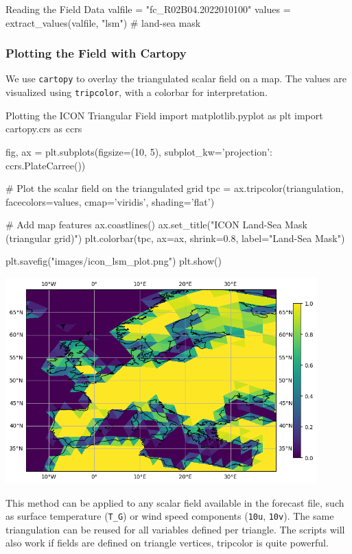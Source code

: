 \begin{codeonly}{Reading the Field Data}
valfile = "fc_R02B04.2022010100"
values = extract_values(valfile, "lsm")  # land-sea mask
\end{codeonly}

\subsubsection*{Plotting the Field with Cartopy}

We use \texttt{cartopy} to overlay the triangulated scalar field on a map. The values are visualized using \texttt{tripcolor}, with a colorbar for interpretation.

\begin{codeonly}{Plotting the ICON Triangular Field}
import matplotlib.pyplot as plt
import cartopy.crs as ccrs

fig, ax = plt.subplots(figsize=(10, 5), subplot_kw={'projection': ccrs.PlateCarree()})

# Plot the scalar field on the triangulated grid
tpc = ax.tripcolor(triangulation, facecolors=values, cmap='viridis', shading='flat')

# Add map features
ax.coastlines()
ax.set_title("ICON Land-Sea Mask (triangular grid)")
plt.colorbar(tpc, ax=ax, shrink=0.8, label="Land-Sea Mask")

plt.savefig("images/icon_lsm_plot.png")
plt.show()
\end{codeonly}

\begin{center}
\includegraphics[width=0.9\textwidth]{images/icon_lsm_plot.png}
\end{center}

This method can be applied to any scalar field available in the forecast file, such as surface temperature (\texttt{T\_G}) or wind speed components (\texttt{10u}, \texttt{10v}). The same triangulation can be reused for all variables defined per triangle. The scripts will also work if fields are defined on triangle vertices, tripcolor is quite powerful.


